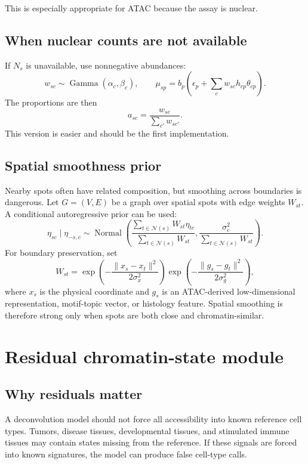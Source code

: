 \documentclass[11pt]{article}
\newcommand{\Normal}{\operatorname{Normal}}
\newcommand{\GammaDist}{\operatorname{Gamma}}
\begin{document}
This is especially appropriate for ATAC because the assay is nuclear.

\subsection{When nuclear counts are not available}

If $N_s$ is unavailable, use nonnegative abundances:
\[
w_{sc}\sim\GammaDist(\alpha_c,\beta_c),
\qquad
\mu_{sp}=b_p\left(\epsilon_p+\sum_c w_{sc}h_{cp}\theta_{cp}\right).
\]
The proportions are then
\[
a_{sc}=\frac{w_{sc}}{\sum_{c'}w_{sc'}}.
\]
This version is easier and should be the first implementation.

\subsection{Spatial smoothness prior}

Nearby spots often have related composition, but smoothing across boundaries is dangerous. Let $G=(V,E)$ be a graph over spatial spots with edge weights $W_{st}$. A conditional autoregressive prior can be used:
\[
\eta_{sc}\mid \eta_{-s,c}
\sim
\Normal\left(
\frac{\sum_{t\in\mathcal{N}(s)}W_{st}\eta_{tc}}{\sum_{t\in\mathcal{N}(s)}W_{st}},
\frac{\sigma_c^2}{\sum_{t\in\mathcal{N}(s)}W_{st}}
\right).
\]
For boundary preservation, set
\[
W_{st}=\exp\left(-\frac{\|x_s-x_t\|^2}{2\sigma_x^2}\right)
\exp\left(-\frac{\|g_s-g_t\|^2}{2\sigma_g^2}\right),
\]
where $x_s$ is the physical coordinate and $g_s$ is an ATAC-derived low-dimensional representation, motif-topic vector, or histology feature. Spatial smoothing is therefore strong only when spots are both close and chromatin-similar.

\section{Residual chromatin-state module}

\subsection{Why residuals matter}

A deconvolution model should not force all accessibility into known reference cell types. Tumors, disease tissues, developmental tissues, and stimulated immune tissues may contain states missing from the reference. If these signals are forced into known signatures, the model can produce false cell-type calls.
\end{document}
